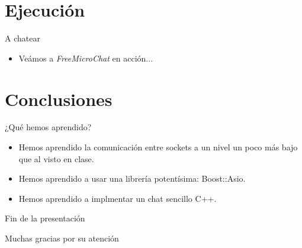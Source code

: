 \documentclass[spanish,xcolor=dvipsnames,svgnames]{beamer}
\newcommand{\freemc}{\textit{FreeMicroChat }}
\begin{document}
\section{Ejecución}
\begin{frame}{}
  \begin{block}{A chatear}
    \begin{itemize}
    \item Veámos a \freemc en acción...
    \end{itemize}
  \end{block}

\end{frame}



\section{Conclusiones}
\begin{frame}{}
  \begin{block}{¿Qué hemos aprendido?}
    \begin{itemize}
    \item Hemos aprendido la comunicación entre sockets a un nivel un poco más bajo que al visto en clase.
    \item Hemos aprendido a usar una librería potentísima: Boost::Asio.
    \item Hemos aprendido a implmentar un chat sencillo C++.
    \end{itemize}
  \end{block}
\end{frame}

\begin{frame}{Fin de la presentación}
  \begin{center}
    {\huge Muchas gracias por su atención}

    \vspace{.1\textheight}

  \end{center}
\end{frame}
\end{document}
